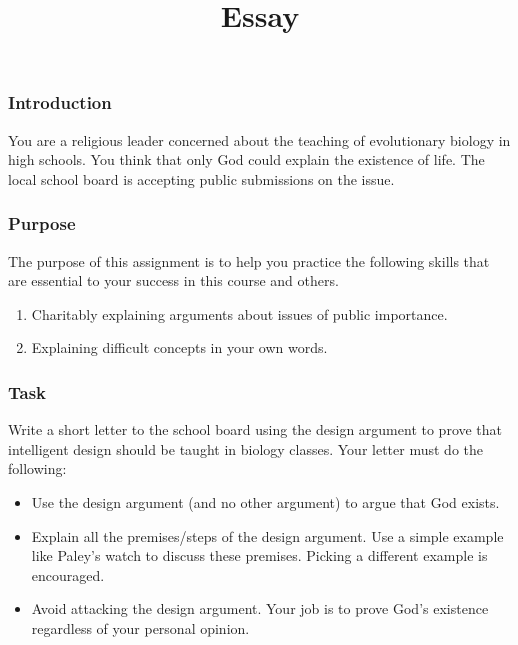 \documentclass[]{article}
\title{Essay}
\date{}
\begin{document}
\maketitle

\subsubsection{Introduction}\label{introduction}

You are a religious leader concerned about the teaching of evolutionary
biology in high schools. You think that only God could explain the
existence of life. The local school board is accepting public
submissions on the issue.

\subsubsection{Purpose}\label{purpose}

The purpose of this assignment is to help you practice the following
skills that are essential to your success in this course and others.

\begin{enumerate}
\item Charitably explaining arguments about issues of public importance. 
\item  Explaining difficult concepts in your own words.
\end{enumerate}

\subsubsection{Task}\label{task}

Write a short letter to the school board using the design argument to
prove that intelligent design should be taught in biology classes. Your
letter must do the following:

\begin{itemize}
\itemsep1pt\parskip0pt
\item
  Use the design argument (and no other argument) to argue that God
  exists.
\item
  Explain all the premises/steps of the design argument. Use a simple
  example like Paley's watch to discuss these premises. Picking a
  different example is encouraged.
\item
  Avoid attacking the design argument. Your job is to prove God's
  existence regardless of your personal opinion.
\end{itemize}
\end{document}
